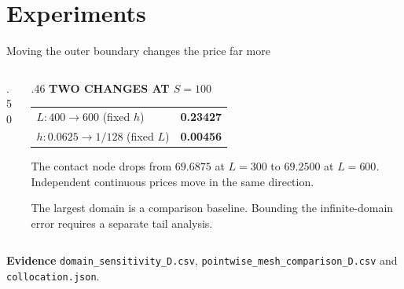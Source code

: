 \documentclass[aspectratio=169,11pt]{beamer}
\newcommand{\labeltext}[1]{{\footnotesize\bfseries\color{Teal}#1}}
\newcommand{\sourcefile}[1]{\par\vfill{\scriptsize\color{Muted}#1\par}}
\begin{document}
\section{Experiments}

\begin{frame}[t]{Moving the outer boundary changes the price far more}
  \begin{columns}[T,onlytextwidth]
    \begin{column}{.50\textwidth}
    \end{column}
    \begin{column}{.46\textwidth}
      \labeltext{TWO CHANGES AT $S=100$}\par\smallskip
      {\small
      \begin{tabular}{@{}lr@{}}
        \toprule
        $L:400\to600$ (fixed $h$) & \bfseries 0.23427 \\
        $h:0.0625\to1/128$ (fixed $L$) & \bfseries 0.00456 \\
        \bottomrule
      \end{tabular}\par}
      \medskip\par
      \small The contact node drops from $69.6875$ at $L=300$ to
      $69.2500$ at $L=600$. Independent continuous prices move in the same direction.
      \medskip\par
      The largest domain is a comparison baseline. Bounding the infinite-domain
      error requires a separate tail analysis.
    \end{column}
  \end{columns}
  \sourcefile{\textbf{Evidence} \enspace \texttt{domain\_sensitivity\_D.csv}, \texttt{pointwise\_mesh\_comparison\_D.csv} and \texttt{collocation.json}.}
\end{frame}
\end{document}
